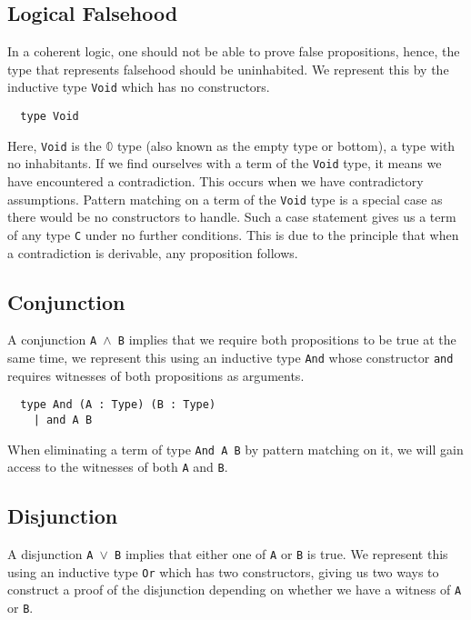 \documentclass[12pt,twoside,maitrise]{dms}
\theoremstyle{definition}
\numberwithin{equation}{section}
\numberwithin{table}{chapter}
\numberwithin{figure}{chapter}
\newcommand\kw[1] {\textsf{#1}}
\newcommand\id[1] {\texttt{#1}}
\newcommand\fn[1] {\texttt{#1}}
\begin{document}
\subsection*{Logical Falsehood}

In a coherent logic, one should not be able to prove false propositions, hence,
the type that represents falsehood should be uninhabited. We represent this by
the inductive type \id{Void} which has no constructors.

\begin{verbatim}
  type Void
\end{verbatim}

Here, \id{Void} is the $\mathbb{0}$ type (also known as the empty type or
bottom), a type with no inhabitants. If we find ourselves with a term of the
\id{Void} type, it means we have encountered a contradiction. This occurs when
we have contradictory assumptions. Pattern matching on a term of the \id{Void}
type is a special case as there would be no constructors to handle. Such a
\kw{case} statement gives us a term of any type \id{C} under no further
conditions. This is due to the principle that when a contradiction is
derivable, any proposition follows.

\subsection*{Conjunction}

A conjunction \fn{A $\wedge$ B} implies that we require both propositions to be
true at the same time, we represent this using an inductive type \id{And} whose
constructor \id{and} requires witnesses of both propositions as arguments.

\begin{verbatim}
  type And (A : Type) (B : Type)
    | and A B
\end{verbatim}

When eliminating a term of type \fn{And A B} by pattern matching on it, we will
gain access to the witnesses of both \id{A} and \id{B}.

\subsection*{Disjunction}

A disjunction \fn{A $\vee$ B} implies that either one of \id{A} or \id{B} is
true. We represent this using an inductive type \id{Or} which has two
constructors, giving us two ways to construct a proof of the disjunction
depending on whether we have a witness of \id{A} or \id{B}.
\end{document}
